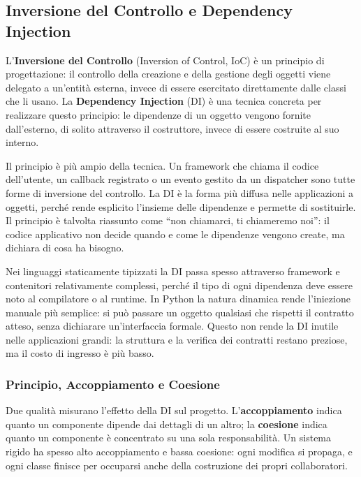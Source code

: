 \documentclass[12pt]{extarticle}
\begin{document}
\subsection{Inversione del Controllo e Dependency Injection}

\noindent L'\textbf{Inversione del Controllo} (Inversion of Control, IoC) è un principio di progettazione: il controllo della creazione e della gestione degli oggetti viene delegato a un'entità esterna, invece di essere esercitato direttamente dalle classi che li usano. La \textbf{Dependency Injection} (DI) è una tecnica concreta per realizzare questo principio: le dipendenze di un oggetto vengono fornite dall'esterno, di solito attraverso il costruttore, invece di essere costruite al suo interno.

\noindent Il principio è più ampio della tecnica. Un framework che chiama il codice dell'utente, un callback registrato o un evento gestito da un dispatcher sono tutte forme di inversione del controllo. La DI è la forma più diffusa nelle applicazioni a oggetti, perché rende esplicito l'insieme delle dipendenze e permette di sostituirle. Il principio è talvolta riassunto come ``non chiamarci, ti chiameremo noi'': il codice applicativo non decide quando e come le dipendenze vengono create, ma dichiara di cosa ha bisogno.

\noindent Nei linguaggi staticamente tipizzati la DI passa spesso attraverso framework e contenitori relativamente complessi, perché il tipo di ogni dipendenza deve essere noto al compilatore o al runtime. In Python la natura dinamica rende l'iniezione manuale più semplice: si può passare un oggetto qualsiasi che rispetti il contratto atteso, senza dichiarare un'interfaccia formale. Questo non rende la DI inutile nelle applicazioni grandi: la struttura e la verifica dei contratti restano preziose, ma il costo di ingresso è più basso.

\subsubsection{Principio, Accoppiamento e Coesione}

\noindent Due qualità misurano l'effetto della DI sul progetto. L'\textbf{accoppiamento} indica quanto un componente dipende dai dettagli di un altro; la \textbf{coesione} indica quanto un componente è concentrato su una sola responsabilità. Un sistema rigido ha spesso alto accoppiamento e bassa coesione: ogni modifica si propaga, e ogni classe finisce per occuparsi anche della costruzione dei propri collaboratori.
\end{document}
